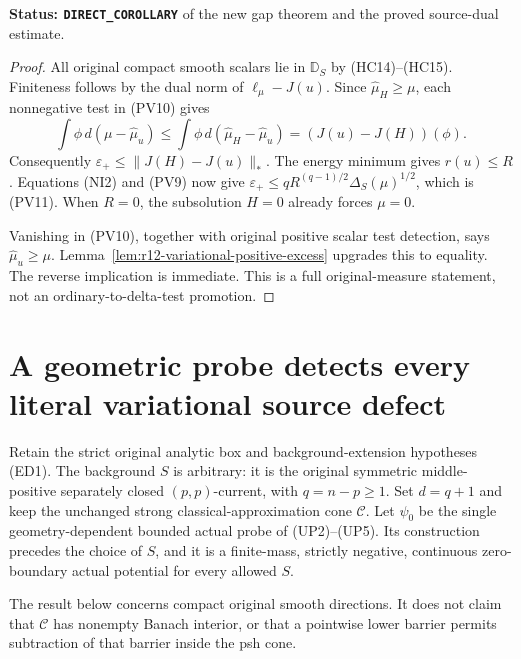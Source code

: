 \documentclass[11pt,a4paper]{article}
\numberwithin{equation}{section}
\theoremstyle{definition}
\theoremstyle{remark}
\begin{document}
\noindent\textbf{Status: \texttt{DIRECT\_COROLLARY}} of
the new gap theorem and the proved source-dual estimate.

\begin{proof}
All original compact smooth scalars lie in $\mathbb D_S$
by (HC14)--(HC15). Finiteness follows by the dual norm of
$\ell_\mu-J(u)$. Since $\widehat\mu_H\geq\mu$, each
nonnegative test in (PV10) gives
\[
 \int\phi\,d(\mu-\widehat\mu_u)
       \leq\int\phi\,d(\widehat\mu_H-\widehat\mu_u)
       =(J(u)-J(H))(\phi).
\]
Consequently $\varepsilon_+\leq\|J(H)-J(u)\|_*$.
The energy minimum gives $r(u)\leq R$. Equations (NI2)
and (PV9) now give
$\varepsilon_+\leq qR^{(q-1)/2}\Delta_S(\mu)^{1/2}$,
which is (PV11). When $R=0$, the subsolution $H=0$
already forces $\mu=0$.

Vanishing in (PV10), together with original positive
scalar test detection, says $\widehat\mu_u\geq\mu$.
Lemma~\ref{lem:r12-variational-positive-excess} upgrades
this to equality. The reverse implication is immediate.
This is a full original-measure statement, not an
ordinary-to-delta-test promotion.
\end{proof}




\section{A geometric probe detects every literal variational source defect}
\label{sec:r12-single-probe-normal-residual}

Retain the strict original analytic box and background-extension
hypotheses \textup{(ED1)}.  The background $S$ is arbitrary:
it is the original symmetric middle-positive separately closed
$(p,p)$-current, with $q=n-p\ge1$.  Set $d=q+1$ and keep
the unchanged strong classical-approximation cone $\mathscr C$.
Let $\psi_0$ be the single geometry-dependent bounded actual
probe of \textup{(UP2)--(UP5)}.  Its construction precedes
the choice of $S$, and it is a finite-mass, strictly negative,
continuous zero-boundary actual potential for every allowed $S$.

The result below concerns compact original smooth directions.
It does not claim that $\mathscr C$ has nonempty Banach
interior, or that a pointwise lower barrier permits subtraction
of that barrier inside the psh cone.
\end{document}

